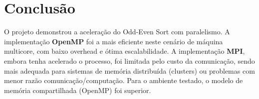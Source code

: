 \documentclass[12pt, a4paper]{article}
\begin{document}
\section{Conclusão}
O projeto demonstrou a aceleração do Odd-Even Sort com paralelismo. A implementação \textbf{OpenMP} foi a mais eficiente neste cenário de máquina multicore, com baixo overhead e ótima escalabilidade. A implementação \textbf{MPI}, embora tenha acelerado o processo, foi limitada pelo custo da comunicação, sendo mais adequada para sistemas de memória distribuída (clusters) ou problemas com menor razão comunicação/computação. Para o ambiente testado, o modelo de memória compartilhada (OpenMP) foi superior.
\end{document}
